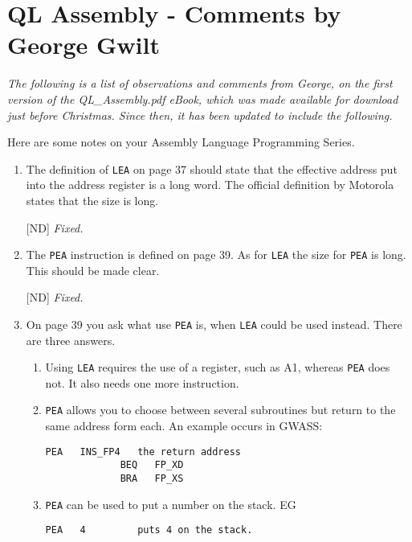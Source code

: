 \chapter{QL Assembly - Comments by George Gwilt}

\emph{The following is a list of observations and comments from George, on the first version of the QL\_Assembly.pdf eBook, which was made available for download just before Christmas. Since then, it has been updated to include the following.}

Here are some notes on your Assembly Language Programming Series.

\begin{enumerate}
\item The definition of \texttt{LEA} on page 37 should state that the effective address put into the address register is a long word. The official definition by Motorola states that the size is long.

[ND] \emph{Fixed.}

\item The \texttt{PEA} instruction is defined on page 39. As for \texttt{LEA} the size for \texttt{PEA} is long. This should be made clear.

[ND] \emph{Fixed.}

\item On page 39 you ask what use \texttt{PEA} is, when \texttt{LEA} could be used instead. There are three answers.

\begin{enumerate}
         \item Using \texttt{LEA} requires the use of a register, such as A1, whereas \texttt{PEA}  does not. It also needs one more instruction.

        \item \texttt{PEA} allows you to choose between several subroutines but return to the same address form each. An example occurs in GWASS:
\begin{lstlisting}[firstnumber=1,caption={PEA Example from Gwass Assembler}]
             PEA   INS_FP4   the return address
             BEQ   FP_XD
             BRA   FP_XS
\end{lstlisting}
         \item \texttt{PEA} can be used to put a number on the stack. EG
\begin{lstlisting}[firstnumber=1,caption={PEA Stacking a Literal Value}]
             PEA   4         puts 4 on the stack.
\end{lstlisting}             
\end{enumerate}


\end{enumerate}
